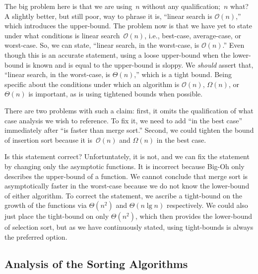 The big problem here is that we are using~$n$ without any qualification;~$n$ what? 
A slightly better, but still poor, way to phrase it is, ``linear search is $\mathcal{O}(n)$,'' which introduces the upper-bound. 
The problem now is that we have yet to state under what conditions is linear search~$\mathcal{O}(n)$, i.e., best-case, average-case, or worst-case. 
So, we can state, ``linear search, in the worst-case, is $\mathcal{O}(n)$.'' 
Even though this is an accurate statement, using a loose upper-bound when the lower-bound is known and is equal to the upper-bound is sloppy. 
We \emph{should} assert that, ``linear search, in the worst-case, is $\Theta(n)$,'' which is a tight bound. 
Being specific about the conditions under which an algorithm is $\mathcal{O}(n)$, $\Omega(n)$, or $\Theta(n)$ is important, as is using tightened bounds when possible.

There are two problems with such a claim: first, it omits the qualification of what case analysis we wish to reference. 
To fix it, we need to add ``in the best case'' immediately after ``is faster than merge sort.'' 
Second, we could tighten the bound of insertion sort because it is~$\mathcal{O}(n)$ and $\Omega(n)$ in the best case.

Is this statement correct? 
Unfortuntately, it is not, and we can fix the statement by changing only the asymptotic functions. 
It is incorrect because Big-Oh only describes the upper-bound of a function. 
We cannot conclude that merge sort is asymptotically faster in the worst-case because we do not know the lower-bound of either algorithm. 
To correct the statement, we ascribe a tight-bound on the growth of the functions via $\Theta(n^2)$ and $\Theta(n\lg{n})$ respectively. 
We could also just place the tight-bound on only $\Theta(n^2)$, which then provides the lower-bound of selection sort, but as we have continuously stated, using tight-bounds is always the preferred option.

\subsection{Analysis of the Sorting Algorithms}

